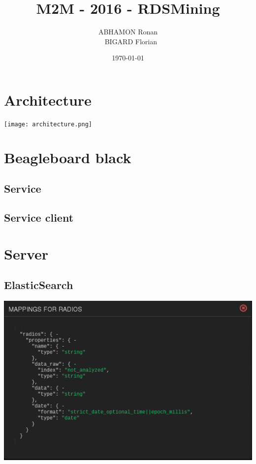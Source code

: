 \documentclass{beamer}
\title{M2M - 2016 - RDSMining}
\author{ABHAMON Ronan \\~ BIGARD Florian}
\institute{Université Joseph Fourier}
\date{\today}
\begin{document}
\begin{frame}
	\titlepage
\end{frame}

\section{Architecture}
\begin{frame}
	\begin{center}
		\texttt{[image: architecture.png]}
	\end{center}
\end{frame}

\section{Beagleboard black}

\subsection{Service}

\subsection{Service client}

\section{Server}

\subsection{ElasticSearch}

\begin{frame}
	\begin{center}
		\includegraphics[scale=0.50]{mapping.png}
	\end{center}
\end{frame}
\end{document}
